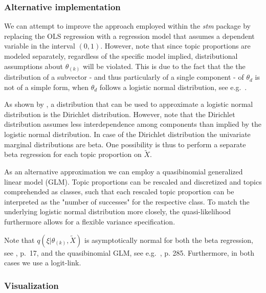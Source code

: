 \subsubsection{Alternative implementation}

We can attempt to improve the approach employed within the \textit{stm} package by replacing the OLS regression with a regression model that assumes a dependent variable in the interval $(0,1)$. However, note that since topic proportions are modeled separately, regardless of the specific model implied, distributional assumptions about $\theta_{(k)}$ will be violated. This is due to the fact that the the distribution of a subvector - and thus particularly of a single component - of $\theta_d$ is not of a simple form, when $\theta_d$ follows a logistic normal distribution, see e.g.\ \cite{atchison1980logistic}.

As shown by \cite{atchison1980logistic}, a distribution that can be used to approximate a logistic normal distribution is the Dirichlet distribution. However, note that the Dirichlet distribution assumes less interdependence among components than implied by the logistic normal distribution. In case of the Dirichlet distribution the univariate marginal distributions are beta. One possibility is thus to perform a separate beta regression for each topic proportion on $\tilde{X}$. 

As an alternative approximation we can employ a quasibinomial generalized linear model (GLM). Topic proportions can be rescaled and discretized and topics comprehended as classes, such that each rescaled topic proportion can be interpreted as the "number of successes" for the respective class. To match the underlying logistic normal distribution more closely, the quasi-likelihood furthermore allows for a flexible variance specification.

Note that $q(\xi| \theta_{(k)}, \tilde{X})$ is asymptotically normal for both the beta regression, see \cite{ferrari2004beta}, p.\ 17, and the quasibinomial GLM, see e.g.\ \cite{fahrmeir2007regression}, p. 285. Furthermore, in both cases we use a logit-link.

\subsubsection{Visualization}

